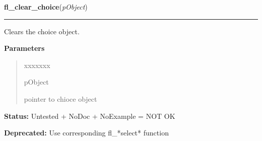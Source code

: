     \label{xformslib:deprecated:fl_clear_choice}

    \vspace{0.5ex}

\hspace{.8\funcindent}\begin{boxedminipage}{\funcwidth}

    \raggedright \textbf{fl\_clear\_choice}(\textit{pObject})

    \vspace{-1.5ex}

    \rule{\textwidth}{0.5\fboxrule}
\setlength{\parskip}{2ex}
    Clears the choice object.

\setlength{\parskip}{1ex}
      \textbf{Parameters}
      \vspace{-1ex}

      \begin{quote}
        \begin{Ventry}{xxxxxxx}

          \item[pObject]

          pointer to chioce object

        \end{Ventry}

      \end{quote}

\textbf{Status:} Untested + NoDoc + NoExample = NOT OK



\textbf{Deprecated:} Use corresponding fl\_*select* function



    \end{boxedminipage}

    \label{xformslib:deprecated:fl_addto_choice}

    \vspace{0.5ex}

